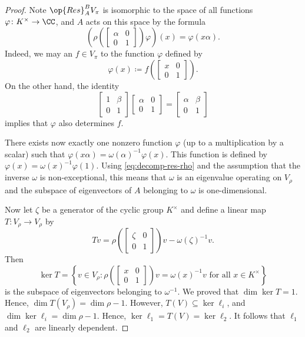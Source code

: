 \documentclass[../main.tex]{subfiles}
\begin{document}
\begin{proof}
	Note $\op{Res}^B_AV_\pi$ is isomorphic to the space of all functions $\varphi\colon K^\times\to\CC$, and $A$ acts on this space by the formula
	\[\left(\rho\left(\begin{bmatrix}
		\alpha & 0 \\
		0 & 1
	\end{bmatrix}\right)\varphi\right)(x)=\varphi(x\alpha).\]
	Indeed, we may an $f\in V_\pi$ to the function $\varphi$ defined by
	\[\varphi(x)\coloneqq f\left(\begin{bmatrix}
		x & 0 \\
		0 & 1
	\end{bmatrix}\right).\]
	On the other hand, the identity
	\[\begin{bmatrix}
		1 & \beta \\
		0 & 1
	\end{bmatrix}\begin{bmatrix}
		\alpha & 0 \\
		0 & 1
	\end{bmatrix}=\begin{bmatrix}
		\alpha & \beta \\
		0 & 1
	\end{bmatrix}\]
	implies that $\varphi$ also determines $f$.

	There exists now exactly one nonzero function $\varphi$ (up to a multiplication by a scalar) such that $\varphi(x\alpha)=\omega(\alpha)^{-1}\varphi(x)$. This function is defined by $\varphi(x)=\omega(x)^{-1}\varphi(1)$. Using \eqref{eq:decomp-res-rho} and the assumption that the inverse $\omega$ is non-exceptional, this means that $\omega$ is an eigenvalue operating on $V_\rho$ and the subspace of eigenvectors of $A$ belonging to $\omega$ is one-dimensional.

	Now let $\zeta$ be a generator of the cyclic group $K^\times$ and define a linear map $T\colon V_\rho\to V_\rho$ by
	\[Tv=\rho\left(\begin{bmatrix}
		\zeta & 0 \\
		0 & 1
	\end{bmatrix}\right)v-\omega(\zeta)^{-1}v.\]
	Then
	\[\ker T=\left\{v\in V_\rho:\rho\left(\begin{bmatrix}
		x & 0 \\
		0 & 1
	\end{bmatrix}\right)v=\omega(x)^{-1}v\text{ for all }x\in K^\times\right\}\]
	is the subspace of eigenvectors belonging to $\omega^{-1}$. We proved that $\dim\ker T=1$. Hence, $\dim T(V_\rho)=\dim\rho-1$. However, $T(V)\subseteq\ker\ell_i$, and $\dim\ker\ell_i=\dim\rho-1$. Hence, $\ker\ell_1=T(V)=\ker\ell_2$. It follows that $\ell_1$ and $\ell_2$ are linearly dependent.
\end{proof}
\end{document}
